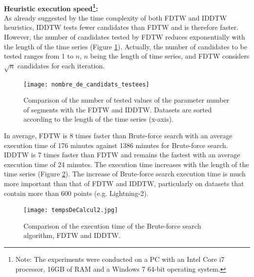 \paragraph{}\textbf{Heuristic execution speed\footnote{Note: The experiments were conducted on a PC with an Intel Core i7 processor, 16GB of RAM and a Windows 7 64-bit operating system.}: }\\
As already suggested by the time complexity of both FDTW and IDDTW heuristics, IDDTW
tests fewer candidates than FDTW and is therefore faster. However, the number of candidates tested
by FDTW reduces exponentially with the length of the time series (Figure
\ref{NumberOfValuesTested}).
Actually, the number of candidates to be tested ranges from 1 to $n$, $n$ being the  length of time
series, and FDTW considers $\sqrt{n}$ candidates for each iteration.



\begin{figure}
\center
\texttt{[image: nombre\_de\_candidats\_testees]}
\caption{Comparison of the number of tested values of the parameter number of segments with
the FDTW and IDDTW.  Datasets are sorted according to
the length of the time series (x-axis). }

\label{NumberOfValuesTested}

\end{figure}

In average, FDTW is 8 times faster than Brute-force search with an average execution time of 176 minutes
against 1386 minutes for Brute-force search. IDDTW is 7 times faster than FDTW and remains
the fastest with an average execution time of 24 minutes. The execution time increases with the length of the time series (Figure 
\ref{tempsDeCalcul}). The increase of Brute-force search execution time is much more important than that of FDTW
and IDDTW, particularly on datasets that contain more than 600 points (e.g. Lightning-2). 

\begin{figure}
\center
\texttt{[image: tempsDeCalcul2.jpg]}
\caption{Comparison of the execution time of
the Brute-force search algorithm, FDTW and IDDTW. }

\label{tempsDeCalcul}

\end{figure}




